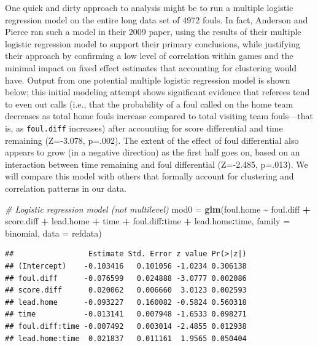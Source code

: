 \documentclass[
]{krantz}
\newenvironment{Shaded}{\begin{snugshade}}{\end{snugshade}}
\newcommand{\AttributeTok}[1]{\textcolor[rgb]{0.27,0.27,0.27}{#1}}
\newcommand{\CommentTok}[1]{\textcolor[rgb]{0.37,0.37,0.37}{\textit{#1}}}
\newcommand{\FunctionTok}[1]{\textcolor[rgb]{0.27,0.27,0.27}{\textbf{#1}}}
\newcommand{\NormalTok}[1]{#1}
\newcommand{\OtherTok}[1]{\textcolor[rgb]{0.37,0.37,0.37}{#1}}
\newcommand{\SpecialCharTok}[1]{\textcolor[rgb]{0.43,0.43,0.43}{\textbf{#1}}}
\begin{document}
One quick and dirty approach to analysis might be to run a multiple logistic regression model on the entire long data set of 4972 fouls. In fact, Anderson and Pierce ran such a model in their 2009 paper, using the results of their multiple logistic regression model to support their primary conclusions, while justifying their approach by confirming a low level of correlation within games and the minimal impact on fixed effect estimates that accounting for clustering would have. Output from one potential multiple logistic regression model is shown below; this initial modeling attempt shows significant evidence that referees tend to even out calls (i.e., that the probability of a foul called on the home team decreases as total home fouls increase compared to total visiting team fouls---that is, as \texttt{foul.diff} increases) after accounting for score differential and time remaining (Z=-3.078, p=.002). The extent of the effect of foul differential also appears to grow (in a negative direction) as the first half goes on, based on an interaction between time remaining and foul differential (Z=-2.485, p=.013). We will compare this model with others that formally account for clustering and correlation patterns in our data.

\begin{Shaded}
\begin{Highlighting}[]
\CommentTok{\# Logistic regression model (not multilevel)}
\NormalTok{mod0 }\OtherTok{=} \FunctionTok{glm}\NormalTok{(foul.home }\SpecialCharTok{\textasciitilde{}}\NormalTok{ foul.diff }\SpecialCharTok{+}\NormalTok{ score.diff }\SpecialCharTok{+}\NormalTok{ lead.home }\SpecialCharTok{+} 
\NormalTok{           time }\SpecialCharTok{+}\NormalTok{ foul.diff}\SpecialCharTok{:}\NormalTok{time }\SpecialCharTok{+}\NormalTok{ lead.home}\SpecialCharTok{:}\NormalTok{time, }
           \AttributeTok{family =}\NormalTok{ binomial, }\AttributeTok{data =}\NormalTok{ refdata)}
\end{Highlighting}
\end{Shaded}

\begin{verbatim}
##                 Estimate Std. Error z value Pr(>|z|)
## (Intercept)    -0.103416   0.101056 -1.0234 0.306138
## foul.diff      -0.076599   0.024888 -3.0777 0.002086
## score.diff      0.020062   0.006660  3.0123 0.002593
## lead.home      -0.093227   0.160082 -0.5824 0.560318
## time           -0.013141   0.007948 -1.6533 0.098271
## foul.diff:time -0.007492   0.003014 -2.4855 0.012938
## lead.home:time  0.021837   0.011161  1.9565 0.050404
\end{verbatim}
\end{document}
